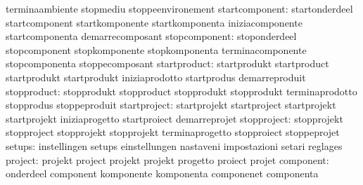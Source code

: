                                   terminaambiente                  stopmediu
                                  stoppeenvironement
                  startcomponent: startonderdeel                   startcomponent
                                  startkomponente                  startkomponenta
                                  iniziacomponente                 startcomponenta
                                  demarrecomposant
                   stopcomponent: stoponderdeel                    stopcomponent
                                  stopkomponente                   stopkomponenta
                                  terminacomponente                stopcomponenta
                                  stoppecomposant
                    startproduct: startprodukt                     startproduct
                                  startprodukt                     startprodukt
                                  iniziaprodotto                   startprodus
                                  demarreproduit
                     stopproduct: stopprodukt                      stopproduct
                                  stopprodukt                      stopprodukt
                                  terminaprodotto                  stopprodus
                                  stoppeproduit
                    startproject: startprojekt                     startproject
                                  startprojekt                     startprojekt
                                  iniziaprogetto                   startproiect
                                  demarreprojet
                     stopproject: stopprojekt                      stopproject
                                  stopprojekt                      stopprojekt
                                  terminaprogetto                  stopproiect
                                  stoppeprojet
                          setups: instellingen                     setups
                                  einstellungen                    nastaveni
                                  impostazioni                     setari
                                  reglages
                         project: projekt                          project
                                  projekt                          projekt
                                  progetto                         proiect
                                  projet
                       component: onderdeel                        component
                                  komponente                       komponenta
                                  componenet                       componenta

